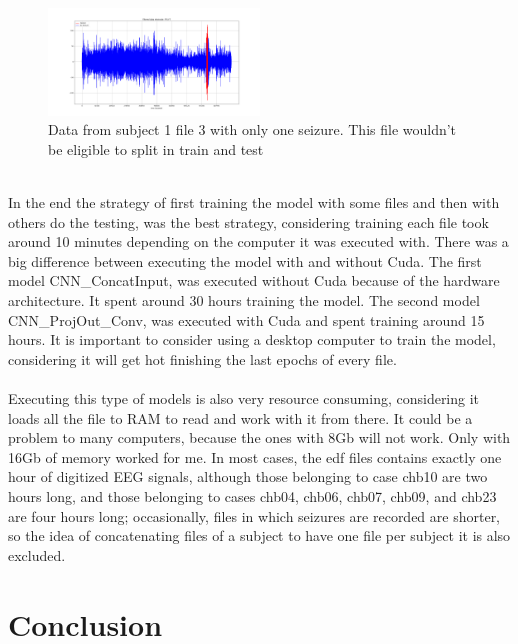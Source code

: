 \begin{figure}[h!]
  \caption{Data from subject 1 file 3 with only one seizure. This file wouldn't be eligible to split in train and test }
  \centering
  \includegraphics[width=0.5\textwidth]{img/1_3-elecFP1-F7.png}
\end{figure}
\leavevmode\\
In the end the strategy of first training the model with some files and then with others do the testing, was the best strategy, considering training each file took around 10 minutes depending on the computer it was executed with. There was a big difference between executing the model with and without Cuda. The first model CNN\_ConcatInput, was executed without Cuda because of the hardware architecture. It spent around 30 hours training the model. The second model CNN\_ProjOut\_Conv, was executed with Cuda and spent training around 15 hours. It is important to consider using a desktop computer to train the model, considering it will get hot finishing the last epochs of every file.
\\\\
Executing this type of models is also very resource consuming, considering it loads all the file to RAM to read and work with it from there. It could be a problem to many computers, because the ones with 8Gb will not work. Only with 16Gb of memory worked for me. In most cases, the edf files contains exactly one hour of digitized EEG signals, although those belonging to case chb10 are two hours long, and those belonging to cases chb04, chb06, chb07, chb09, and chb23 are four hours long; occasionally, files in which seizures are recorded are shorter, so the idea of concatenating files of a subject to have one file per subject it is also excluded.
\\


\section{Conclusion}
